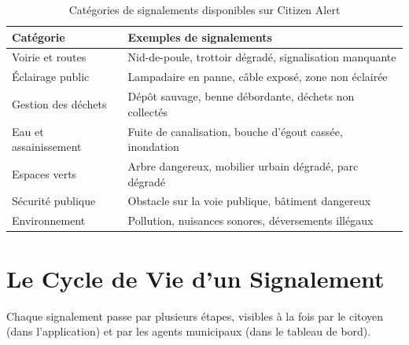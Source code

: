 \documentclass[12pt, a4paper]{article}
\begin{document}
\begin{table}[h!]
\centering
\begin{tabularx}{\textwidth}{lX}
\toprule
\textbf{Catégorie} & \textbf{Exemples de signalements} \\
\midrule
Voirie et routes      & Nid-de-poule, trottoir dégradé, signalisation manquante \\
Éclairage public      & Lampadaire en panne, câble exposé, zone non éclairée \\
Gestion des déchets   & Dépôt sauvage, benne débordante, déchets non collectés \\
Eau et assainissement & Fuite de canalisation, bouche d'égout cassée, inondation \\
Espaces verts         & Arbre dangereux, mobilier urbain dégradé, parc dégradé \\
Sécurité publique     & Obstacle sur la voie publique, bâtiment dangereux \\
Environnement         & Pollution, nuisances sonores, déversements illégaux \\
\bottomrule
\end{tabularx}
\caption{Catégories de signalements disponibles sur Citizen Alert}
\end{table}

\section{Le Cycle de Vie d'un Signalement}

Chaque signalement passe par plusieurs étapes, visibles à la fois par le citoyen (dans l'application) et par les agents municipaux (dans le tableau de bord).

\begin{center}
\end{center}
\end{document}
